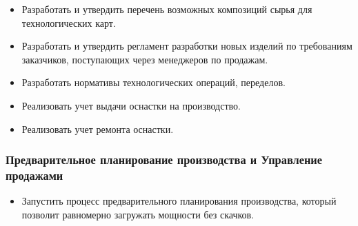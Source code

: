  \begin{itemize}
 \item Разработать и утвердить перечень возможных композиций сырья для технологических карт. 

\item Разработать и утвердить регламент разработки новых изделий по требованиям заказчиков, поступающих через менеджеров по продажам. 

\item Разработать нормативы технологических операций, переделов.
 
 \item Реализовать учет выдачи оснастки на производство.
 
\item Реализовать учет ремонта оснастки.

 \end{itemize}

\subsubsection{Предварительное планирование производства и Управление продажами}
\begin{itemize}
\item Запустить процесс предварительного планирования производства, который позволит равномерно загружать мощности без скачков.
\end{itemize}


